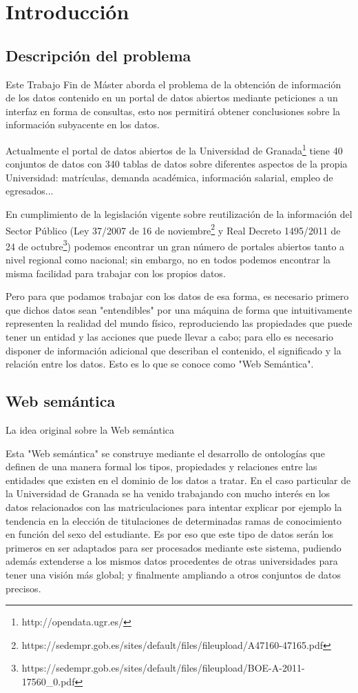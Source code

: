 \chapter{Introducción}

\section{Descripción del problema}

Este Trabajo Fin de Máster aborda el problema de la obtención de información de los datos contenido en un portal de datos abiertos mediante peticiones a un interfaz en forma de consultas, esto nos permitirá obtener conclusiones sobre la información subyacente en los datos.

\bigskip
Actualmente el portal de datos abiertos de la Universidad de Granada\footnote{http://opendata.ugr.es/} tiene 40 conjuntos de datos con 340 tablas de datos sobre diferentes aspectos de la propia Universidad: matrículas, demanda académica, información salarial, empleo de egresados...

\bigskip
En cumplimiento de la legislación vigente sobre reutilización de la información del Sector Público (Ley 37/2007 de 16 de noviembre\footnote{https://sedempr.gob.es/sites/default/files/fileupload/A47160-47165.pdf} y Real Decreto 1495/2011 de 24 de octubre\footnote{https://sedempr.gob.es/sites/default/files/fileupload/BOE-A-2011-17560\_0.pdf}) podemos encontrar un gran número de portales abiertos tanto a nivel regional como nacional; sin embargo, no en todos podemos encontrar la misma facilidad para trabajar con los propios datos.

\bigskip
Pero para que podamos trabajar con los datos de esa forma, es necesario primero que dichos datos sean "entendibles" por una máquina de forma que intuitivamente representen la realidad del mundo físico, reproduciendo las propiedades que puede tener un entidad y las acciones que puede llevar a cabo; para ello es necesario disponer de información adicional que describan el contenido, el significado y la relación entre los datos. Esto es lo que se conoce como "Web Semántica".

\section{Web semántica}
La idea original sobre la Web semántica

\bigskip
Esta "Web semántica" se construye mediante el desarrollo de ontologías que definen de una manera formal los tipos, propiedades y relaciones entre las entidades que existen en el dominio de los datos a tratar. En el caso particular de la Universidad de Granada se ha venido trabajando con mucho interés en los datos relacionados con las matriculaciones para intentar explicar por ejemplo la tendencia en la elección de titulaciones de determinadas ramas de conocimiento en función del sexo del estudiante. Es por eso que este tipo de datos serán los primeros en ser adaptados para ser procesados mediante este sistema, pudiendo además extenderse a los mismos datos procedentes de otras universidades para tener una visión más global; y finalmente ampliando a otros conjuntos de datos precisos. 

